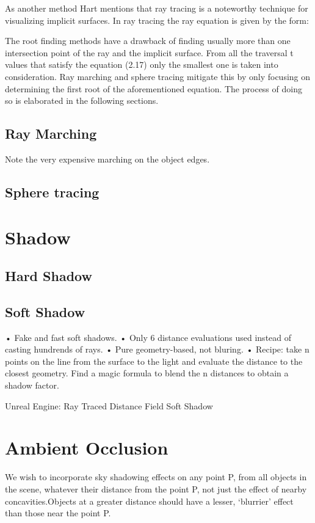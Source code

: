 As another method Hart mentions that ray tracing is a noteworthy technique for visualizing implicit surfaces. In ray tracing the ray equation is given by the form:

The root finding methods have a drawback of finding usually more than one intersection point of the ray and the implicit surface. From all the traversal t values that satisfy the equation (2.17) only the smallest one is taken into consideration. Ray marching and sphere tracing mitigate this by only focusing on determining the first root of the aforementioned equation. The process of doing so is elaborated in the following sections.

\subsection{Ray Marching}
Note the very expensive marching on the object edges.
\subsection{Sphere tracing}


\section{Shadow}
\subsection{Hard Shadow}
\subsection*{Soft Shadow}
• Fake and fast soft shadows.
• Only 6 distance evaluations used instead of casting hundrends of rays. • Pure geometry-based, not bluring.
• Recipe: take n points on the line from the surface to the light and evaluate the distance to the closest geometry. Find a magic formula to blend the n distances to obtain a shadow factor.


Unreal Engine: Ray Traced Distance Field Soft Shadow

\section{Ambient Occlusion}

We wish to incorporate sky shadowing effects on any point P, from all objects in the scene, whatever their distance from the point P, not just the effect of nearby concavities.Objects at a greater distance should have a lesser, ‘blurrier’ effect than those near the point P.

